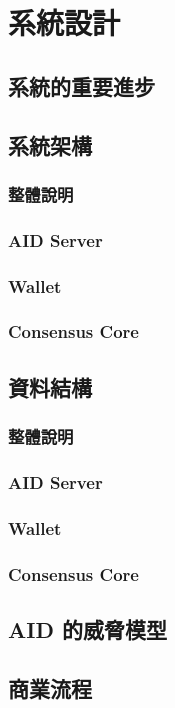 
\chapter{系統設計}

\section{系統的重要進步}

\section{系統架構}
\subsection{整體說明}
\subsection{AID Server}
\subsection{Wallet}
\subsection{Consensus Core}

\section{資料結構}
\subsection{整體說明}
\subsection{AID Server}
\subsection{Wallet}
\subsection{Consensus Core}

\section{AID 的威脅模型}

\section{商業流程}
